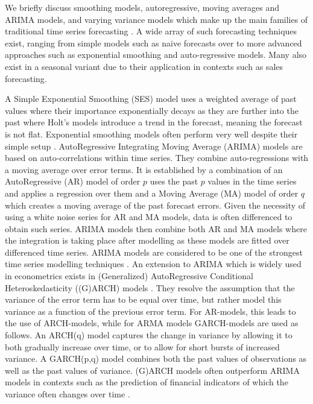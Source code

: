 We briefly discuss smoothing models, autoregressive, moving averages and ARIMA models, and varying variance models which make up the main families of traditional time series forecasting \cite{hyndman2018forecasting}.
A wide array of such forecasting techniques exist, ranging from simple models such as naive forecasts over to more advanced approaches such as exponential smoothing and auto-regressive models.
Many also exist in a seasonal variant due to their application in contexts such as sales forecasting.

A Simple Exponential Smoothing (SES) model uses a weighted average of past values where their importance exponentially decays as they are further into the past where Holt's models introduce a trend in the forecast, meaning the forecast is not flat.
Exponential smoothing models often perform very well despite their simple setup \cite{makridakis2018statistical}.
AutoRegressive Integrating Moving Average (ARIMA) models are based on auto-correlations within time series. 
They combine auto-regressions with a moving average over error terms.
It is established by a combination of an AutoRegressive (AR) model of order $p$ uses the past $p$ values in the time series and applies a regression over them and a Moving Average (MA) model of order $q$ which creates a moving average of the past forecast errors.
Given the necessity of using a white noise series for AR and MA models, data is often differenced to obtain such series.
ARIMA models then combine both AR and MA models where the integration is taking place after modelling as these models are fitted over differenced time series.
ARIMA models are considered to be one of the strongest time series modelling techniques \cite{hyndman2018forecasting}.
An extension to ARIMA which is widely used in econometrics exists in (Generalized) AutoRegressive Conditional Heteroskedasticity ((G)ARCH) models \cite{francq2019garch}.
They resolve the assumption that the variance of the error term has to be equal over time, but rather model this variance as a function of the previous error term.
For AR-models, this leads to the use of ARCH-models, while for ARMA models GARCH-models are used as follows.
An ARCH(q) model captures the change in variance by allowing it to both gradually increase over time, or to allow for short bursts of increased variance.
A GARCH(p,q) model combines both the past values of observations as well as the past values of variance.
(G)ARCH models often outperform ARIMA models in contexts such as the prediction of financial indicators of which the variance often changes over time \cite{francq2019garch}.









